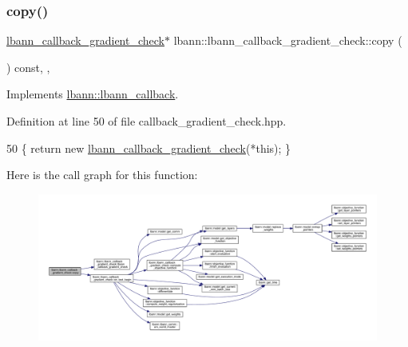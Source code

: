 \subsubsection{\texorpdfstring{copy()}{copy()}}
{\footnotesize\ttfamily \hyperlink{classlbann_1_1lbann__callback__gradient__check}{lbann\+\_\+callback\+\_\+gradient\+\_\+check}$\ast$ lbann\+::lbann\+\_\+callback\+\_\+gradient\+\_\+check\+::copy (\begin{DoxyParamCaption}{ }\end{DoxyParamCaption}) const\hspace{0.3cm}{\ttfamily [inline]}, {\ttfamily [override]}, {\ttfamily [virtual]}}



Implements \hyperlink{classlbann_1_1lbann__callback_a9f545d1269a8c7af335625d049691f26}{lbann\+::lbann\+\_\+callback}.



Definition at line 50 of file callback\+\_\+gradient\+\_\+check.\+hpp.


\begin{DoxyCode}
50 \{ \textcolor{keywordflow}{return} \textcolor{keyword}{new} \hyperlink{classlbann_1_1lbann__callback__gradient__check_ae198159c613bb05e00f49b824a61afbb}{lbann\_callback\_gradient\_check}(*\textcolor{keyword}{this}); \}
\end{DoxyCode}
Here is the call graph for this function\+:\nopagebreak
\begin{figure}[H]
\begin{center}
\leavevmode
\includegraphics[width=350pt]{classlbann_1_1lbann__callback__gradient__check_a3cf248258a45ee721907864d62a17355_cgraph}
\end{center}
\end{figure}
\mbox{\label{classlbann_1_1lbann__callback__gradient__check_ad068bba7a10853f38cc9f58867dc468b}} 
